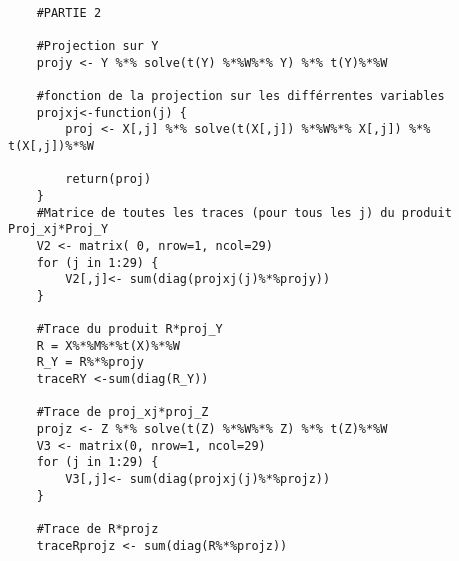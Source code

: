 \documentclass[a4paper,10pt]{article}
\begin{document}
\begin{verbatim}
	
	#PARTIE 2
	
	#Projection sur Y
	projy <- Y %*% solve(t(Y) %*%W%*% Y) %*% t(Y)%*%W
	
	#fonction de la projection sur les différrentes variables
	projxj<-function(j) {
		proj <- X[,j] %*% solve(t(X[,j]) %*%W%*% X[,j]) %*% t(X[,j])%*%W
		
		return(proj)
	}
	#Matrice de toutes les traces (pour tous les j) du produit Proj_xj*Proj_Y
	V2 <- matrix( 0, nrow=1, ncol=29)
	for (j in 1:29) {
		V2[,j]<- sum(diag(projxj(j)%*%projy))
	}
	
	#Trace du produit R*proj_Y
	R = X%*%M%*%t(X)%*%W
	R_Y = R%*%projy
	traceRY <-sum(diag(R_Y))
	
	#Trace de proj_xj*proj_Z
	projz <- Z %*% solve(t(Z) %*%W%*% Z) %*% t(Z)%*%W
	V3 <- matrix(0, nrow=1, ncol=29)
	for (j in 1:29) {
		V3[,j]<- sum(diag(projxj(j)%*%projz))
	}
	
	#Trace de R*projz
	traceRprojz <- sum(diag(R%*%projz))
\end{verbatim}
	
	
\end{document}
